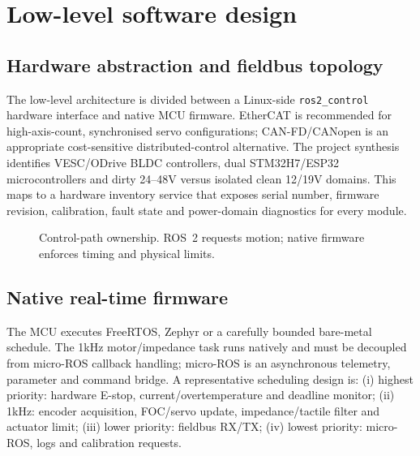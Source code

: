 \documentclass[10pt,a4paper]{article}
\begin{document}
\section{Low-level software design}
\subsection{Hardware abstraction and fieldbus topology}
The low-level architecture is divided between a Linux-side \texttt{ros2\_control} hardware interface and native MCU firmware. EtherCAT is recommended for high-axis-count, synchronised servo configurations; CAN-FD/CANopen is an appropriate cost-sensitive distributed-control alternative. The project synthesis identifies VESC/ODrive BLDC controllers, dual STM32H7/ESP32 microcontrollers and dirty 24--48V versus isolated clean 12/19V domains. This maps to a hardware inventory service that exposes serial number, firmware revision, calibration, fault state and power-domain diagnostics for every module.

\begin{figure}[ht]
\centering
{}
\caption{Control-path ownership. ROS~2 requests motion; native firmware enforces timing and physical limits.}
\label{fig:lowlevel}
\end{figure}

\subsection{Native real-time firmware}
The MCU executes FreeRTOS, Zephyr or a carefully bounded bare-metal schedule. The 1kHz motor/impedance task runs natively and must be decoupled from micro-ROS callback handling; micro-ROS is an asynchronous telemetry, parameter and command bridge. A representative scheduling design is: (i) highest priority: hardware E-stop, current/overtemperature and deadline monitor; (ii) 1kHz: encoder acquisition, FOC/servo update, impedance/tactile filter and actuator limit; (iii) lower priority: fieldbus RX/TX; (iv) lowest priority: micro-ROS, logs and calibration requests.
\end{document}
